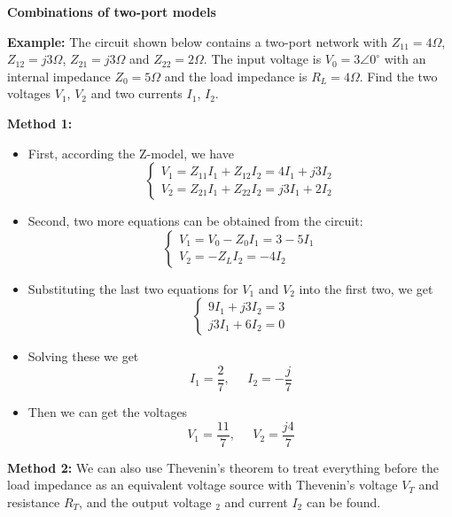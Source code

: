 {\bf Combinations of two-port models}


{\bf Example:} The circuit shown below contains a two-port network with
$Z_{11}=4\Omega$, $Z_{12}=j3\Omega$, $Z_{21}=j3\Omega$ and $Z_{22}=2\Omega$.
The input voltage is $V_0=3\angle 0^\circ$ with an internal impedance 
$Z_0=5\Omega$ and the load impedance is $R_L=4\Omega$. Find the two voltages 
$V_1$, $V_2$ and two currents $I_1$, $I_2$.


{\bf Method 1:} 
\begin{itemize}
\item First, according the Z-model, we have
\[ \left\{ \begin{array}{l} V_1=Z_{11}I_1+Z_{12}I_2= 4I_1+j3I_2 \\
	V_2=Z_{21}I_1+Z_{22}I_2=j3I_1+ 2I_2 \end{array} \right.	\]
\item Second, two more equations can be obtained from the circuit:
\[ \left\{ \begin{array}{l} V_1=V_0-Z_0 I_1=3-5I_1 \\
	V_2=-Z_L I_2=-4 I_2 \end{array} \right.	\]
\item Substituting the last two equations for $V_1$ and $V_2$ into the 
	first two, we get
\[ \left\{ \begin{array}{l} 9I_1+j3I_2=3 \\ j3I_1+6I_2=0 \end{array} \right. \]
\item Solving these we get 
\[	I_1=\frac{2}{7},\;\;\;\;\;I_2=-\frac{j}{7} \]
\item Then we can get the voltages
\[	V_1=\frac{11}{7},\;\;\;\;\;V_2=\frac{j4}{7} \]
\end{itemize}

{\bf Method 2:} We can also use Thevenin's theorem to treat everything before
the load impedance as an equivalent voltage source with Thevenin's voltage
$V_T$ and resistance $R_T$, and the output voltage $_2$ and current $I_2$ can
be found.

